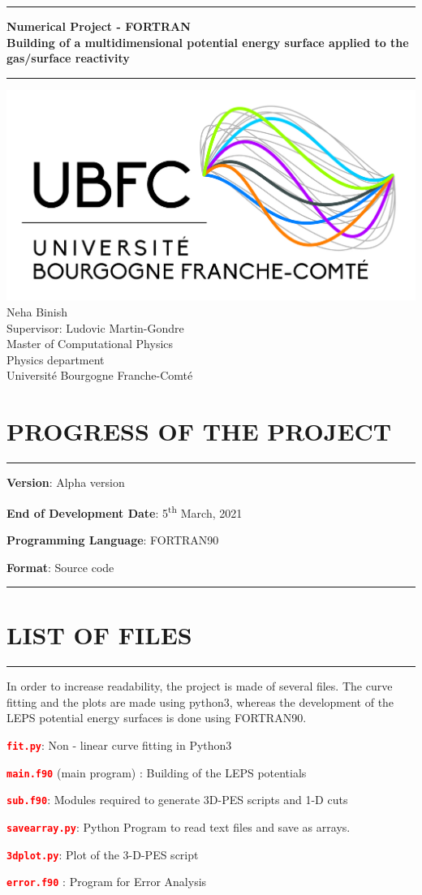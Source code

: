 \documentclass[12pt]{article}
\newcommand{\JMUTitle}[9]{

  \thispagestyle{empty}
  {\parindent0cm
  \rule{\linewidth}{.7ex}}
  
  \begin{center}
    \vspace*{\stretch{1}}
    \sffamily\bfseries\Huge
    #1\\
    \vspace*{\stretch{1}}
    \sffamily\bfseries\large
    #2
    \vspace*{\stretch{1}}
  \end{center}
  \rule{\linewidth}{.7ex}

  \vspace*{\stretch{1}}
  \begin{center}
    \includegraphics{LogoUBFC.jpg} \\
    \vspace*{\stretch{1}}
    \Large Neha Binish  \\
    \vspace*{\stretch{1}}
    \Large Supervisor:  Ludovic Martin-Gondre  \\

    \vspace*{\stretch{2}}
    \large Master of Computational Physics\\
    \large Physics department\\
    \large Université Bourgogne Franche-Comté\\
    \vspace*{\stretch{1}}
    
  \end{center}
}
\begin{document}
\JMUTitle
      {Numerical Project - FORTRAN}
      {Building of a multidimensional potential energy surface applied to
       the gas/surface reactivity}                       

      
      { }  
      {Besançon  2021}                         
      
      { }                              
      { }                         
      
  \clearpage

\tableofcontents
\clearpage 

\section{PROGRESS OF THE PROJECT}
\par\noindent\rule{\textwidth}{0.4pt}

\textbf{Version}: Alpha version 

\textbf{End of Development Date}: 5\textsuperscript{th} March, 2021

\textbf{Programming Language}: FORTRAN90

\textbf{Format}: Source code
\par\noindent\rule{\textwidth}{0.4pt}

\section{LIST OF FILES}
\par\noindent\rule{\textwidth}{0.4pt}
In order to increase readability, the project is made of several files. The curve fitting and the plots are made using python3, whereas the development of the LEPS potential energy surfaces is done using FORTRAN90. 

{\fontsize{10}{6}\textbf{\textcolor{red}{\texttt{fit.py}}}}: Non - linear curve fitting in Python3

{\fontsize{10}{6}\textbf{\textcolor{red}{\texttt{main.f90}}}} (main program) : Building of the LEPS potentials

{\fontsize{10}{6}\textbf{\textcolor{red}{\texttt{sub.f90}}}}: Modules required to generate 3D-PES scripts and 1-D cuts

{\fontsize{10}{6}\textbf{\textcolor{red}{\texttt{savearray.py}}}}: Python Program to read text files and save as arrays.

{\fontsize{10}{6}\textbf{\textcolor{red}{\texttt{3dplot.py}}}}: Plot of the 3-D-PES script

{\fontsize{10}{6}\textbf{\textcolor{red}{\texttt{error.f90}}}} : Program for Error Analysis
\end{document}
